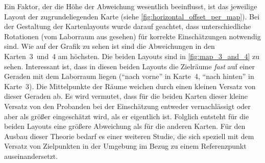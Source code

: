 Ein Faktor, der die Höhe der Abweichung wesentlich beeinflusst, ist das jeweilige Layout der zugrundeliegenden Karte (siehe \autoref{fig:horizontal_offset_per_map}).
Bei der Gestaltung der Kartenlayouts wurde darauf geachtet, dass unterschiedliche Rotationen (vom Laborraum aus gesehen) für korrekte Einschätzungen notwendig sind.
Wie auf der Grafik zu sehen ist sind die Abweichungen in den Karten~3~und~4 am höchsten.
Die beiden Layouts sind in \autoref{fig:map_3_and_4} zu sehen.
Interessant ist, dass in diesen beiden Layouts die Zielräume \emph{fast} auf einer Geraden mit dem Laborraum liegen (\enquote{nach vorne} in Karte~4, \enquote{nach hinten} in Karte~3).
Die Mittelpunkte der Räume weichen durch einen kleinen Versatz von dieser Geraden ab.
Es wird vermutet, dass für die beiden Karten dieser kleine Versatz von den Probanden bei der Einschätzung entweder vernachlässigt oder aber als größer eingeschätzt wird, als er eigentlich ist.
Folglich entsteht für die beiden Layouts eine größere Abweichung als für die anderen Karten.
Für den Ausbau dieser Theorie bedarf es einer weiteren Studie, die sich speziell mit dem Versatz von Zielpunkten in der Umgebung im Bezug zu einem Referenzpunkt auseinandersetzt.
